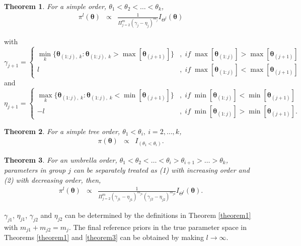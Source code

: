 \documentclass[Proceedings]{ascelike}
\newtheorem{thm}{Theorem}
\begin{document}
\begin{thm}
\label{theorem1}
For a simple order, $\theta_1<\theta_2<\hdots<\theta_k$,
\begin{eqnarray}
\pi^{l}(\boldsymbol{\theta})
& \propto &
\frac{1}{\Pi_{j=2}^{m}(\gamma_j-\eta_j)^{m_j}}I_{\Theta^{l}}(\boldsymbol{\theta})\nonumber
\end{eqnarray}
\end{thm}
with
\begin{displaymath}
\gamma_{j+1} = \left\{
\begin{array}{lr}
\min\limits_{k}\{\boldsymbol{\theta}_{(1:j),\;k}:\boldsymbol{\theta}_{(1:j),\;k}>\max[\boldsymbol{\theta}_{(j+1)}]\} &,\; if\; \max[\boldsymbol{\theta}_{(1:j)}]> \max[\boldsymbol{\theta}_{(j+1)}]\\
l &,\; if\; \max[\boldsymbol{\theta}_{(1:j)}]< \max[\boldsymbol{\theta}_{(j+1)}]
\end{array}
\right.
\end{displaymath} 
and
\begin{displaymath}
\eta_{j+1} = \left\{
\begin{array}{lr}
\max\limits_{k}\{\boldsymbol{\theta}_{(1:j),\;k}:\boldsymbol{\theta}_{(1:j),\;k}<\min[\boldsymbol{\theta}_{(j+1)}]\} &,\; if\; \min[\boldsymbol{\theta}_{(1:j)}]< \min[\boldsymbol{\theta}_{(j+1)}]\\
-l &,\; if\; \min[\boldsymbol{\theta}_{(1:j)}]> \min[\boldsymbol{\theta}_{(j+1)}].
\end{array}
\right.
\end{displaymath} 
\begin{thm}
\label{theorem2}
For a simple tree order, $\theta_1<\theta_i,\ i=2,\hdots,k$,
\begin{eqnarray}
\pi(\boldsymbol{\theta})
& \propto &
I_{(\theta_1<\theta_i)}.\nonumber
\end{eqnarray}
\end{thm}
\begin{thm} 
\label{theorem3}
For an umbrella order,
$\theta_1<\theta_2<\hdots<\theta_i>\theta_{i+1}>\hdots>\theta_k$,
parameters in group $j$ can be separately treated as (1) with
increasing order and (2) with decreasing order, then,
\begin{eqnarray}
\pi^{l}(\boldsymbol{\theta}) & \propto &
\frac{1}{\Pi_{j=2}^{m}(\gamma_{j1}-\eta_{j1})^{m_{j1}}(\gamma_{j2}-\eta_{j2})^{m_{j2}}}I_{\Theta^{l}}(\boldsymbol{\theta}).\nonumber
\end{eqnarray}
\end{thm}
$\gamma_{j1}$, $\eta_{j1}$, $\gamma_{j2}$ and $\eta_{j2}$ can be
determined by the definitions in Theorem \eqref{theorem1} with
$m_{j1}+m_{j2}=m_j$. The final reference priors in the true parameter
space in Theorems \eqref{theorem1} and \eqref{theorem3} can be obtained by
making $l\to\infty$.
\end{document}
